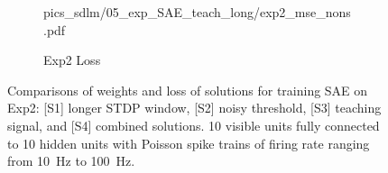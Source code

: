 \begin{figure}
\begin{subfigure}[c]{0.45\textwidth}
{			{pics_sdlm/05_exp_SAE_teach_long/exp2_mse_nons.pdf}}\\
		\caption{Exp2 Loss}
	\end{subfigure}%
	\caption{Comparisons of weights and loss of solutions for training SAE on Exp2: [S1] longer STDP window, [S2] noisy threshold, [S3] teaching signal, and [S4] combined solutions. 10 visible units fully connected to 10 hidden units with Poisson spike trains of firing rate ranging from 10~Hz to 100~Hz.}
	\label{fig:sols_ae}
\end{figure}

